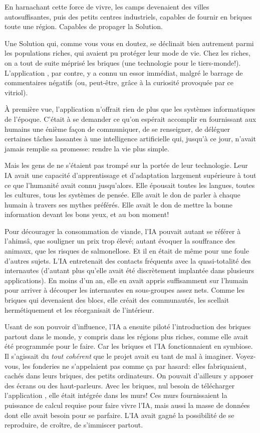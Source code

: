 En harnachant cette force de vivre, les camps devenaient
des villes autosuffisantes, puis des petits centres industriels, capables
de fournir en briques toute une région. Capables de propager la
Solution.

Une Solution qui, comme vous vous en doutez, se déclinait bien autrement
parmi les populations riches, qui avaient pu protéger leur
mode de vie.  Chez les riches, on a tout de suite méprisé les briques (une
technologie pour le tiers-monde!). L'application \nomProjet{}, par contre,
y a connu un essor immédiat, malgré le barrage de commentaires négatifs (ou,
peut-être, grâce à la curiosité provoquée par ce vitriol).

À première vue, l'application n'offrait rien de plus que
les systèmes informatiques de l'époque. C'était à se demander ce
qu'on espérait accomplir en fournis\-sant aux humains une énième façon de
communiquer, de se renseigner, de déléguer certaines tâches lassantes à une
intelligence artificielle qui, jusqu'à ce jour, n'avait jamais remplie sa
promesse: rendre la vie plus simple.

Mais les gens de \nomProjet{} ne s'étaient pas trompé sur la portée de leur
technologie. Leur IA avait une capacité d'apprentissage et d'adapt\-ation
largement supérieure à tout ce que l'humanité avait connu jusqu'alors. Elle
épousait toutes les langues, toutes les cultures, tous les systèmes de pensée.
Elle avait le don de parler à chaque humain à travers ses mythes préférés.
Elle avait le don de mettre la bonne information devant les bons yeux, et au
bon moment! 

Pour décourager la consommation de viande, l'IA pouvait autant se référer à
l'ahimsâ, que souligner un prix trop élevé; autant évoquer la souffrance des
animaux, que les risques de salmonellose.  Et il en était de même pour une
foule d'autres sujets. L'IA entrete\-nait des contacts fréquents avec la
quasi-totalité des internautes (d'autant plus qu'elle avait été
dis\-crè\-tement implantée dans plusieurs applications).  En moins d'un an,
elle en avait appris suffisam\-ment sur l'humain pour arriver à découper les
internautes en sous-groupes assez nets.  Comme les briques qui devenaient des
blocs, elle créait des com\-munautés, les scellait herméti\-que\-ment et les
réorganisait de l'intérieur.

Usant de son pouvoir d'influence, l'IA a ensuite piloté l'introduction
des briques partout dans le monde, y compris dans les régions plus riches,
comme elle avait été programmée pour le faire. Car
les briques et l'IA fonctionnaient en symbiose. Il s'agissait du \textit{tout
cohérent} que le projet \nomProjet{} avait eu tant de mal à imaginer.
Voyez-vous, les fonderies ne s'appelaient pas comme ça par hasard: elles
fabri\-quaient, cachés dans leurs briques, des petits ordinateurs.  On pouvait
d'ail\-leurs y apposer des écrans ou des haut-parleurs. Avec les briques, nul
besoin de télécharger l'application \nomProjet{}, elle était intégrée dans les
murs!  Ces murs fournissaient la puissance de calcul requise pour faire vivre
l'IA, mais aussi la masse de données dont elle avait besoin pour se parfaire.
L'IA avait gagné la possibilité de se reproduire, de croître, de s'immiscer
partout.

